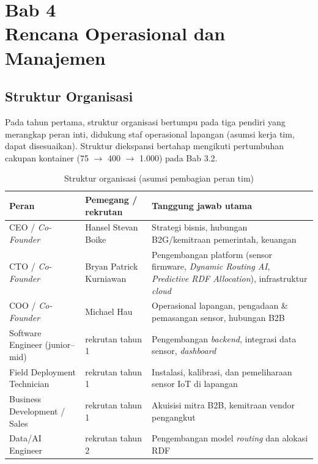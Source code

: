 \section{Bab 4\\Rencana Operasional dan Manajemen}

\subsection{Struktur Organisasi}
\label{sec:4-1}

Pada tahun pertama, struktur organisasi \ProductName{} bertumpu pada tiga pendiri yang merangkap peran inti, didukung staf operasional lapangan (asumsi kerja tim, dapat disesuaikan). Struktur diekspansi bertahap mengikuti pertumbuhan cakupan kontainer (75 $\rightarrow$ 400 $\rightarrow$ 1.000) pada Bab 3.2.

\begin{table}[H]
\footnotesize
\renewcommand{\arraystretch}{0.85}
\begin{tabularx}{\textwidth}{|>{\RaggedRight\arraybackslash}l|>{\RaggedRight\arraybackslash}X|>{\RaggedRight\arraybackslash}X|}
\hline
\textbf{Peran} & \textbf{Pemegang / rekrutan} & \textbf{Tanggung jawab utama} \\
\hline
CEO / \textit{Co-Founder} & Hansel Stevan Boike & Strategi bisnis, hubungan B2G/kemitraan pemerintah, keuangan \\
\hline
CTO / \textit{Co-Founder} & Bryan Patrick Kurniawan & Pengembangan platform (sensor firmware, \textit{Dynamic Routing AI}, \textit{Predictive RDF Allocation}), infrastruktur \textit{cloud} \\
\hline
COO / \textit{Co-Founder} & Michael Hau & Operasional lapangan, pengadaan \& pemasangan sensor, hubungan B2B \\
\hline
Software Engineer (junior--mid) & rekrutan tahun 1 & Pengembangan \textit{backend}, integrasi data sensor, \textit{dashboard} \\
\hline
Field Deployment Technician & rekrutan tahun 1 & Instalasi, kalibrasi, dan pemeliharaan sensor IoT di lapangan \\
\hline
Business Development / Sales & rekrutan tahun 1 & Akuisisi mitra B2B, kemitraan vendor pengangkut \\
\hline
Data/AI Engineer & rekrutan tahun 2 & Pengembangan model \textit{routing} dan alokasi RDF \\
\hline
\end{tabularx}
\caption{Struktur organisasi \ProductName{} (asumsi pembagian peran tim)}
\end{table}

